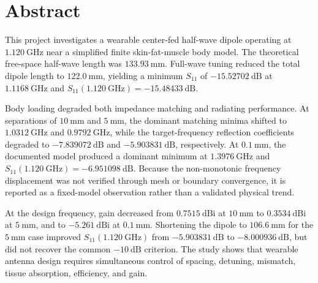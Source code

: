 \chapter*{Abstract}

This project investigates a wearable center-fed half-wave dipole operating at \(1.120~\mathrm{GHz}\) near a simplified finite skin-fat-muscle body model. The theoretical free-space half-wave length was \(133.93~\mathrm{mm}\). Full-wave tuning reduced the total dipole length to \(122.0~\mathrm{mm}\), yielding a minimum \(S_{11}\) of \(-15.52702~\mathrm{dB}\) at \(1.1168~\mathrm{GHz}\) and \(S_{11}(1.120~\mathrm{GHz})=-15.48433~\mathrm{dB}\).

Body loading degraded both impedance matching and radiating performance. At separations of \(10~\mathrm{mm}\) and \(5~\mathrm{mm}\), the dominant matching minima shifted to \(1.0312~\mathrm{GHz}\) and \(0.9792~\mathrm{GHz}\), while the target-frequency reflection coefficients degraded to \(-7.839072~\mathrm{dB}\) and \(-5.903831~\mathrm{dB}\), respectively. At \(0.1~\mathrm{mm}\), the documented model produced a dominant minimum at \(1.3976~\mathrm{GHz}\) and \(S_{11}(1.120~\mathrm{GHz})=-6.951098~\mathrm{dB}\). Because the non-monotonic frequency displacement was not verified through mesh or boundary convergence, it is reported as a fixed-model observation rather than a validated physical trend.

At the design frequency, gain decreased from \(0.7515~\mathrm{dBi}\) at \(10~\mathrm{mm}\) to \(0.3534~\mathrm{dBi}\) at \(5~\mathrm{mm}\), and to \(-5.261~\mathrm{dBi}\) at \(0.1~\mathrm{mm}\). Shortening the dipole to \(106.6~\mathrm{mm}\) for the \(5~\mathrm{mm}\) case improved \(S_{11}(1.120~\mathrm{GHz})\) from \(-5.903831~\mathrm{dB}\) to \(-8.000936~\mathrm{dB}\), but did not recover the common \(-10~\mathrm{dB}\) criterion. The study shows that wearable antenna design requires simultaneous control of spacing, detuning, mismatch, tissue absorption, efficiency, and gain.
